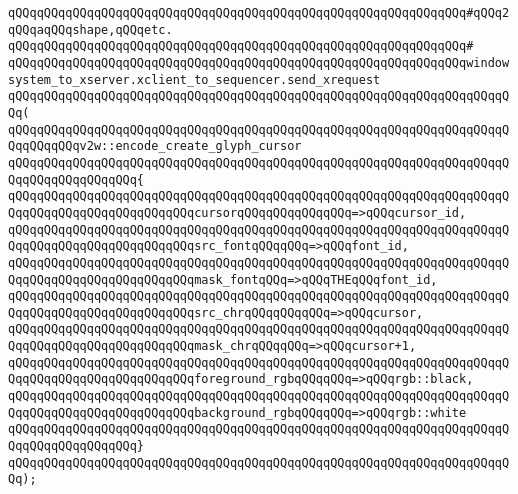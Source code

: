 \verb|qQQqqQQqqQQqqQQqqQQqqQQqqQQqqQQqqQQqqQQqqQQqqQQqqQQqqQQqqQQqqQQq#qQQq2qQQqaqQQqshape,qQQqetc.|\newline
\verb|qQQqqQQqqQQqqQQqqQQqqQQqqQQqqQQqqQQqqQQqqQQqqQQqqQQqqQQqqQQqqQQq#|\newline
\verb|qQQqqQQqqQQqqQQqqQQqqQQqqQQqqQQqqQQqqQQqqQQqqQQqqQQqqQQqqQQqqQQqwindowsystem_to_xserver.xclient_to_sequencer.send_xrequest|\newline
\verb|qQQqqQQqqQQqqQQqqQQqqQQqqQQqqQQqqQQqqQQqqQQqqQQqqQQqqQQqqQQqqQQqqQQqqQQq(|\newline
\verb|qQQqqQQqqQQqqQQqqQQqqQQqqQQqqQQqqQQqqQQqqQQqqQQqqQQqqQQqqQQqqQQqqQQqqQQqqQQqqQQqv2w::encode_create_glyph_cursor|\newline
\verb|qQQqqQQqqQQqqQQqqQQqqQQqqQQqqQQqqQQqqQQqqQQqqQQqqQQqqQQqqQQqqQQqqQQqqQQqqQQqqQQqqQQqqQQq{|\newline
\verb|qQQqqQQqqQQqqQQqqQQqqQQqqQQqqQQqqQQqqQQqqQQqqQQqqQQqqQQqqQQqqQQqqQQqqQQqqQQqqQQqqQQqqQQqqQQqqQQqcursorqQQqqQQqqQQqqQQq=>qQQqcursor_id,|\newline
\newline
\verb|qQQqqQQqqQQqqQQqqQQqqQQqqQQqqQQqqQQqqQQqqQQqqQQqqQQqqQQqqQQqqQQqqQQqqQQqqQQqqQQqqQQqqQQqqQQqqQQqsrc_fontqQQqqQQq=>qQQqfont_id,|\newline
\verb|qQQqqQQqqQQqqQQqqQQqqQQqqQQqqQQqqQQqqQQqqQQqqQQqqQQqqQQqqQQqqQQqqQQqqQQqqQQqqQQqqQQqqQQqqQQqqQQqmask_fontqQQq=>qQQqTHEqQQqfont_id,|\newline
\newline
\verb|qQQqqQQqqQQqqQQqqQQqqQQqqQQqqQQqqQQqqQQqqQQqqQQqqQQqqQQqqQQqqQQqqQQqqQQqqQQqqQQqqQQqqQQqqQQqqQQqsrc_chrqQQqqQQqqQQq=>qQQqcursor,|\newline
\verb|qQQqqQQqqQQqqQQqqQQqqQQqqQQqqQQqqQQqqQQqqQQqqQQqqQQqqQQqqQQqqQQqqQQqqQQqqQQqqQQqqQQqqQQqqQQqqQQqmask_chrqQQqqQQq=>qQQqcursor+1,|\newline
\newline
\verb|qQQqqQQqqQQqqQQqqQQqqQQqqQQqqQQqqQQqqQQqqQQqqQQqqQQqqQQqqQQqqQQqqQQqqQQqqQQqqQQqqQQqqQQqqQQqqQQqforeground_rgbqQQqqQQq=>qQQqrgb::black,|\newline
\verb|qQQqqQQqqQQqqQQqqQQqqQQqqQQqqQQqqQQqqQQqqQQqqQQqqQQqqQQqqQQqqQQqqQQqqQQqqQQqqQQqqQQqqQQqqQQqqQQqbackground_rgbqQQqqQQq=>qQQqrgb::white|\newline
\verb|qQQqqQQqqQQqqQQqqQQqqQQqqQQqqQQqqQQqqQQqqQQqqQQqqQQqqQQqqQQqqQQqqQQqqQQqqQQqqQQqqQQqqQQq}|\newline
\verb|qQQqqQQqqQQqqQQqqQQqqQQqqQQqqQQqqQQqqQQqqQQqqQQqqQQqqQQqqQQqqQQqqQQqqQQq);|\newline
